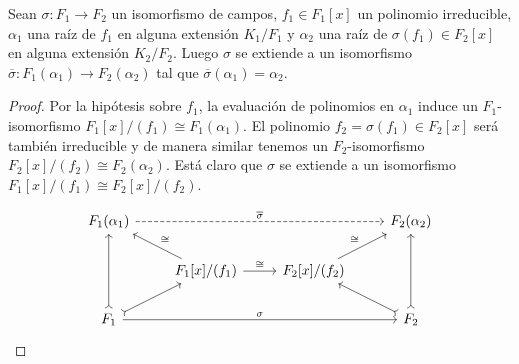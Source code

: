 \begin{lema}
  \label{lema:extesion-de-isomorfismos-a-F(alpha)}
  Sean $\sigma\colon F_1\to F_2$ un isomorfismo de campos, $f_1 \in F_1 [x]$ un
  polinomio irreducible, $\alpha_1$ una raíz de $f_1$ en alguna extensión
  $K_1/F_1$ y $\alpha_2$ una raíz de $\sigma (f_1) \in F_2 [x]$ en alguna
  extensión $K_2/F_2$. Luego $\sigma$ se extiende a un isomorfismo
  $\overline{\sigma}\colon F_1 (\alpha_1) \to F_2 (\alpha_2)$ tal que
  $\overline{\sigma} (\alpha_1) = \alpha_2$.

  \begin{proof}
    Por la hipótesis sobre $f_1$, la evaluación de polinomios en $\alpha_1$
    induce un $F_1$-isomorfismo $F_1 [x]/(f_1) \cong F_1 (\alpha_1)$.
    El polinomio $f_2 = \sigma (f_1) \in F_2 [x]$ será también irreducible y
    de manera similar tenemos un $F_2$-isomorfismo
    $F_2[x]/(f_2) \cong F_2 (\alpha_2)$.  Está claro que $\sigma$ se extiende a
    un isomorfismo $F_1 [x]/(f_1) \cong F_2 [x]/(f_2)$.

    \[ \begin{tikzcd}
      F_1 (\alpha_1)\ar[dashed]{rrr}{\overline{\sigma}} & & & F_2 (\alpha_2) \\
       & F_1 [x]/(f_1) \ar{r}{\cong}\ar{ul}[swap]{\cong} & F_2 [x]/(f_2)\ar{ur}{\cong} \\
      F_1 \ar[>->]{uu}\ar[>->]{ur}\ar{rrr}{\sigma} & & & F_2\ar[>->]{uu}\ar[>->]{ul}
    \end{tikzcd} \]
  \end{proof}
\end{lema}

